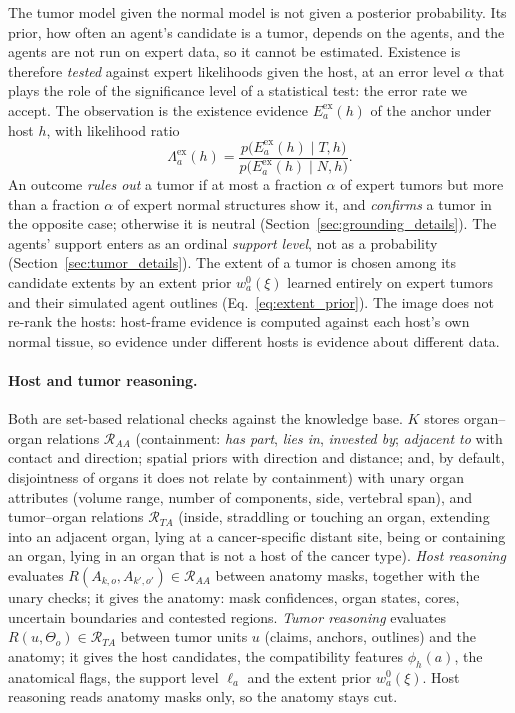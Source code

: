\documentclass[fleqn,10pt]{olplainarticle}
\begin{document}
The tumor model given the normal model is not given a posterior probability. Its prior, how often an agent's candidate is
a tumor, depends on the agents, and the agents are not run on expert data, so it cannot be estimated. Existence is
therefore \emph{tested} against expert likelihoods given the host, at an error level $\alpha$ that plays the role of the
significance level of a statistical test: the error rate we accept. The observation is the existence evidence
$E^{\mathrm{ex}}_a(h)$ of the anchor under host $h$, with likelihood ratio
\begin{equation}
\label{eq:likelihood_ratios}
\Lambda^{\mathrm{ex}}_a(h)=\frac{p\bigl(E^{\mathrm{ex}}_a(h)\mid T,h\bigr)}{p\bigl(E^{\mathrm{ex}}_a(h)\mid N,h\bigr)}.
\end{equation}
An outcome \emph{rules out} a tumor if at most a fraction $\alpha$ of expert tumors but more than a fraction $\alpha$ of expert
normal structures show it, and \emph{confirms} a tumor in the opposite case; otherwise it is neutral
(Section~\ref{sec:grounding_details}). The agents' support enters as an ordinal \emph{support level}, not as a probability
(Section~\ref{sec:tumor_details}). The extent of a tumor is chosen among its candidate extents by an extent prior
$w^0_a(\xi)$ learned entirely on expert tumors and their simulated agent outlines (Eq.~\eqref{eq:extent_prior}). The image
does not re-rank the hosts: host-frame evidence is computed against each host's own normal tissue, so evidence under
different hosts is evidence about different data.

\paragraph{Host and tumor reasoning.}
Both are set-based relational checks against the knowledge base. $K$ stores organ--organ relations $\mathcal{R}_{AA}$
(containment: \emph{has part}, \emph{lies in}, \emph{invested by}; \emph{adjacent to} with contact and direction; spatial
priors with direction and distance; and, by default, disjointness of organs it does not relate by containment) with unary
organ attributes (volume range, number of components, side, vertebral span), and tumor--organ relations $\mathcal{R}_{TA}$
(inside, straddling or touching an organ, extending into an adjacent organ, lying at a cancer-specific distant site, being
or containing an organ, lying in an organ that is not a host of the cancer type). \emph{Host reasoning} evaluates
$R(A_{k,o},A_{k',o'})\in\mathcal{R}_{AA}$ between anatomy masks, together with the unary checks; it gives the anatomy:
mask confidences, organ states, cores, uncertain boundaries and contested regions. \emph{Tumor reasoning} evaluates
$R(u,\Theta_o)\in\mathcal{R}_{TA}$ between tumor units $u$ (claims, anchors, outlines) and the anatomy; it gives the host
candidates, the compatibility features $\phi_h(a)$, the anatomical flags, the support level $\ell_a$ and the extent
prior $w^0_a(\xi)$. Host reasoning reads anatomy masks only, so the anatomy stays cut.
\end{document}
